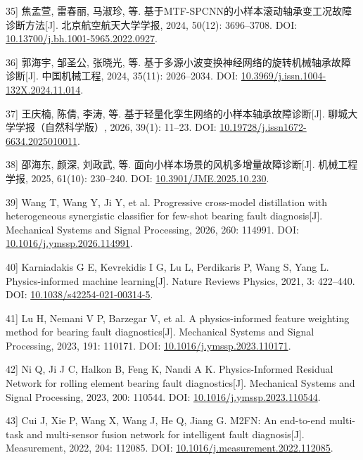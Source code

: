 \documentclass[UTF8,12pt,openany,twoside]{ctexbook}
\numberwithin{equation}{chapter}
\begin{document}
\noindent\begingroup\samepage {[}35{]} 焦孟萱, 雷春丽, 马淑珍, 等. 基于MTF-SPCNN的小样本滚动轴承变工况故障诊断方法[J]. 北京航空航天大学学报, 2024, 50(12): 3696--3708. DOI: \url{10.13700/j.bh.1001-5965.2022.0927}.\par\endgroup

\noindent\begingroup\samepage {[}36{]} 郭海宇, 邹圣公, 张晓光, 等. 基于多源小波变换神经网络的旋转机械轴承故障诊断[J]. 中国机械工程, 2024, 35(11): 2026--2034. DOI: \url{10.3969/j.issn.1004-132X.2024.11.014}.\par\endgroup

\noindent\begingroup\samepage {[}37{]} 王庆楠, 陈倩, 李涛, 等. 基于轻量化孪生网络的小样本轴承故障诊断[J]. 聊城大学学报（自然科学版）, 2026, 39(1): 11--23. DOI: \url{10.19728/j.issn1672-6634.2025010011}.\par\endgroup

\noindent\begingroup\samepage {[}38{]} 邵海东, 颜深, 刘政武, 等. 面向小样本场景的风机多增量故障诊断[J]. 机械工程学报, 2025, 61(10): 230--240. DOI: \url{10.3901/JME.2025.10.230}.\par\endgroup

\noindent\begingroup\samepage {[}39{]} Wang T, Wang Y, Ji Y, et al. Progressive cross-model distillation with heterogeneous synergistic classifier for few-shot bearing fault diagnosis[J]. Mechanical Systems and Signal Processing, 2026, 260: 114991. DOI: \url{10.1016/j.ymssp.2026.114991}.\par\endgroup

\noindent\begingroup\samepage {[}40{]} Karniadakis G E, Kevrekidis I G, Lu L, Perdikaris P, Wang S, Yang L. Physics-informed machine learning[J]. Nature Reviews Physics, 2021, 3: 422--440. DOI: \url{10.1038/s42254-021-00314-5}.\par\endgroup

\noindent\begingroup\samepage {[}41{]} Lu H, Nemani V P, Barzegar V, et al. A physics-informed feature weighting method for bearing fault diagnostics[J]. Mechanical Systems and Signal Processing, 2023, 191: 110171. DOI: \url{10.1016/j.ymssp.2023.110171}.\par\endgroup

\noindent\begingroup\samepage {[}42{]} Ni Q, Ji J C, Halkon B, Feng K, Nandi A K. Physics-Informed Residual Network for rolling element bearing fault diagnostics[J]. Mechanical Systems and Signal Processing, 2023, 200: 110544. DOI: \url{10.1016/j.ymssp.2023.110544}.\par\endgroup

\noindent\begingroup\samepage {[}43{]} Cui J, Xie P, Wang X, Wang J, He Q, Jiang G. M2FN: An end-to-end multi-task and multi-sensor fusion network for intelligent fault diagnosis[J]. Measurement, 2022, 204: 112085. DOI: \url{10.1016/j.measurement.2022.112085}.\par\endgroup
\end{document}
